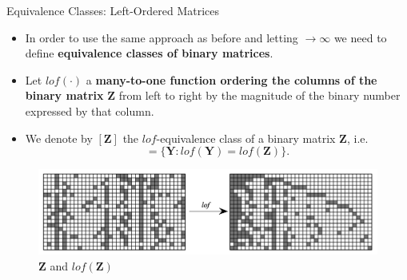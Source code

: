 \documentclass[aspectratio=169,xcolor=dvipsnames]{beamer}
\newcommand{\matz}{\textbf{Z}}
\begin{document}
\begin{frame}{Equivalence Classes: Left-Ordered Matrices}
\setlength{\leftmargini}{0.2cm}
\begin{itemize}
\item In order to use the same approach as before and letting $\rightarrow\infty$ we need to define \textbf{equivalence classes of binary matrices}.
\item Let $lof( \cdot)$ a \textbf{many-to-one function ordering the columns of the binary matrix} $\matz$ from left to right by the magnitude of the binary number expressed by that column.
\item We denote by  $[\matz]$ the $lof$-equivalence class of a binary matrix $\matz$, i.e. 
\begin{equation*}
    [\matz] = \{ \boldsymbol{Y}: lof(\boldsymbol{Y})=lof(\matz)\}.
\end{equation*}
\end{itemize}
\begin{figure}
    \centering
    \includegraphics[width=0.7\columnwidth]{utilities/lof.png}
    \caption{$\matz$ and $lof(\matz)$}
    \label{fig:my_label}
\end{figure}
\end{frame}
\end{document}
